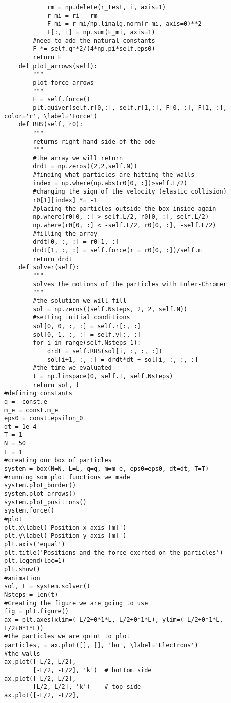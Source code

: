 \documentclass[%
oneside,                 %
final,                   %
10pt]{article}
\begin{document}
\begin{verbatim}
            rm = np.delete(r_test, i, axis=1)
            r_mi = ri - rm
            F_mi = r_mi/np.linalg.norm(r_mi, axis=0)**2
            F[:, i] = np.sum(F_mi, axis=1)
        #need to add the natural constants
        F *= self.q**2/(4*np.pi*self.eps0)
        return F
    def plot_arrows(self):
        """
        plot force arrows
        """
        F = self.force()
        plt.quiver(self.r[0,:], self.r[1,:], F[0, :], F[1, :], color='r', \label='Force')
    def RHS(self, r0):
        """
        returns right hand side of the ode
        """
        #the array we will return
        drdt = np.zeros((2,2,self.N))
        #finding what particles are hitting the walls
        index = np.where(np.abs(r0[0, :])>self.L/2)
        #changing the sign of the velocity (elastic collision)
        r0[1][index] *= -1
        #placing the particles outside the box inside again
        np.where(r0[0, :] > self.L/2, r0[0, :], self.L/2)
        np.where(r0[0, :] < -self.L/2, r0[0, :], -self.L/2)
        #filling the array
        drdt[0, :, :] = r0[1, :]
        drdt[1, :, :] = self.force(r = r0[0, :])/self.m
        return drdt
    def solver(self):
        """
        solves the motions of the particles with Euler-Chromer
        """
        #the solution we will fill
        sol = np.zeros((self.Nsteps, 2, 2, self.N))
        #setting initial conditions
        sol[0, 0, :, :] = self.r[:, :]
        sol[0, 1, :, :] = self.v[:, :]
        for i in range(self.Nsteps-1):
            drdt = self.RHS(sol[i, :, :, :])
            sol[i+1, :, :] = drdt*dt + sol[i, :, :, :]
        #the time we evaluated
        t = np.linspace(0, self.T, self.Nsteps)
        return sol, t
#defining constants
q = -const.e
m_e = const.m_e
eps0 = const.epsilon_0
dt = 1e-4
T = 1
N = 50
L = 1
#creating our box of particles
system = box(N=N, L=L, q=q, m=m_e, eps0=eps0, dt=dt, T=T)
#running som plot functions we made
system.plot_border()
system.plot_arrows()
system.plot_positions()
system.force()
#plot
plt.x\label('Position x-axis [m]')
plt.y\label('Position y-axis [m]')
plt.axis('equal')
plt.title('Positions and the force exerted on the particles')
plt.legend(loc=1)
plt.show()
#animation
sol, t = system.solver()
Nsteps = len(t)
#Creating the figure we are going to use
fig = plt.figure()
ax = plt.axes(xlim=(-L/2+0*1*L, L/2+0*1*L), ylim=(-L/2+0*1*L, L/2+0*1*L))
#the particles we are goint to plot
particles, = ax.plot([], [], 'bo', \label='Electrons')
#the walls
ax.plot([-L/2, L/2],
        [-L/2, -L/2], 'k')  # bottom side
ax.plot([-L/2, L/2],
        [L/2, L/2], 'k')    # top side
ax.plot([-L/2, -L/2],

\end{verbatim}
\end{document}
